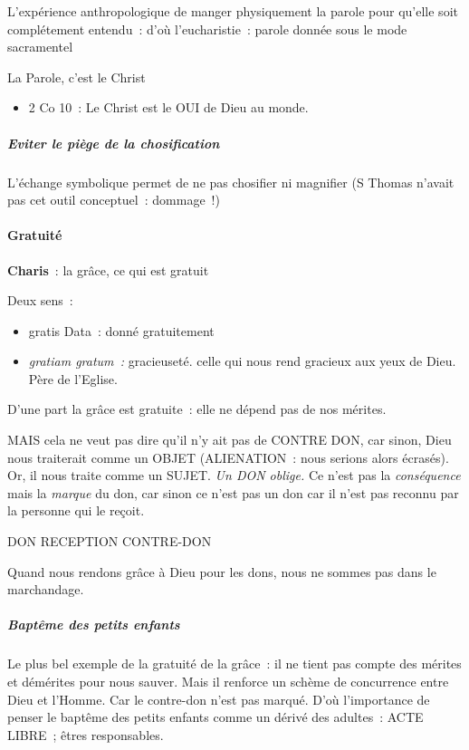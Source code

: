 L'expérience anthropologique de manger physiquement la parole pour
qu'elle soit complétement entendu~: d'où l'eucharistie~: parole donnée
sous le mode sacramentel

La Parole, c'est le Christ

\begin{itemize}
\item
  2 Co 10~: Le Christ est le OUI de Dieu au monde.
\end{itemize}

\hypertarget{eviter-le-piuxe8ge-de-la-chosification}{%
\subparagraph{Eviter le piège de la
chosification}\label{eviter-le-piuxe8ge-de-la-chosification}}

L'échange symbolique permet de ne pas chosifier ni magnifier (S Thomas
n'avait pas cet outil conceptuel~: dommage~!)

\hypertarget{c.-gratuituxe9}{%
\paragraph{Gratuité}\label{c.-gratuituxe9}}

\textbf{Charis}~: la grâce, ce qui est gratuit

Deux sens~:

\begin{itemize}
\item
  gratis Data~: donné gratuitement
\item
  \emph{gratiam gratum~:} gracieuseté. celle qui nous rend gracieux aux
  yeux de Dieu. Père de l'Eglise.
\end{itemize}

D'une part la grâce est gratuite~: elle ne dépend pas de nos mérites.

MAIS cela ne veut pas dire qu'il n'y ait pas de CONTRE DON, car sinon,
Dieu nous traiterait comme un OBJET (ALIENATION~: nous serions alors
écrasés). Or, il nous traite comme un SUJET. \emph{Un DON oblige.} Ce
n'est pas la \emph{conséquence} mais la \emph{marque} du don, car sinon
ce n'est pas un don car il n'est pas reconnu par la personne qui le
reçoit.

DON RECEPTION CONTRE-DON

Quand nous rendons grâce à Dieu pour les dons, nous ne sommes pas dans
le marchandage.

\hypertarget{baptuxeame-des-petits-enfants}{%
\subparagraph{Baptême des petits
enfants}\label{baptuxeame-des-petits-enfants}}

Le plus bel exemple de la gratuité de la grâce~: il ne tient pas compte
des mérites et démérites pour nous sauver. Mais il renforce un schème de
concurrence entre Dieu et l'Homme. Car le contre-don n'est pas marqué.
D'où l'importance de penser le baptême des petits enfants comme un
dérivé des adultes~: ACTE LIBRE~; êtres responsables.

